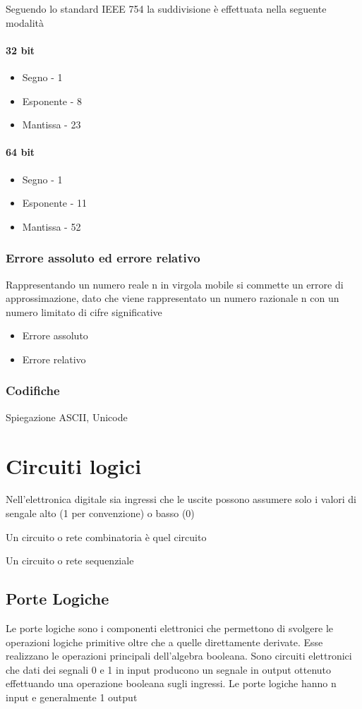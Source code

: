 \documentclass[12pt, a4paper, openany]{book}
\begin{document}
Seguendo lo standard IEEE 754 la suddivisione è effettuata nella seguente modalità
\subsubsection{32 bit}
\begin{itemize}
    \item Segno - 1
    \item Esponente - 8
    \item Mantissa - 23
\end{itemize}
\subsubsection{64 bit}
\begin{itemize}
    \item Segno - 1
    \item Esponente - 11
    \item Mantissa - 52
\end{itemize}

\subsection{Errore assoluto ed errore relativo}
Rappresentando un numero reale n in virgola mobile si commette un errore di approssimazione,
dato che viene rappresentato un numero razionale n con un numero limitato di cifre significative
\begin{itemize}
    \item Errore assoluto
    \item Errore relativo
\end{itemize}
\subsection{Codifiche}
Spiegazione ASCII, Unicode

\chapter{Circuiti logici}

Nell'elettronica digitale sia ingressi che le uscite possono assumere solo i valori di sengale alto (1 per convenzione) o basso (0)

Un circuito o rete combinatoria è quel circuito

Un circuito o rete sequenziale

\section{Porte Logiche}
Le porte logiche sono i componenti elettronici che permettono di svolgere le operazioni logiche
primitive oltre che a quelle direttamente derivate.
Esse realizzano le operazioni principali dell'algebra booleana. Sono circuiti elettronici che dati dei segnali 0 e 1 in input
producono un segnale in output ottenuto effettuando una operazione booleana sugli ingressi.
Le porte logiche hanno n input e generalmente 1 output
\end{document}
